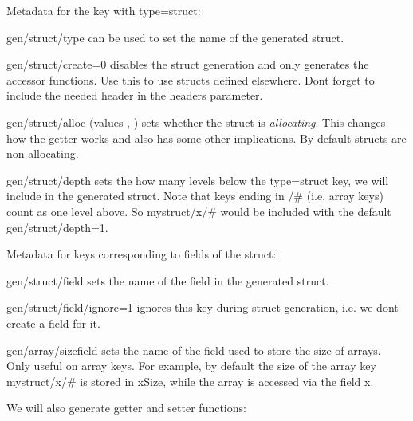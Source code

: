 \begin{DoxyItemize}
\item Metadata for the key with {\ttfamily type=struct}\+:
\begin{DoxyItemize}
\item {\ttfamily gen/struct/type} can be used to set the name of the generated struct.
\item {\ttfamily gen/struct/create=0} disables the struct generation and only generates the accessor functions. Use this to use structs defined elsewhere. Don\textquotesingle{}t forget to include the needed header in the {\ttfamily headers} parameter.
\item {\ttfamily gen/struct/alloc} (values {}, {}) sets whether the struct is {\itshape allocating}. This changes how the getter works and also has some other implications. By default structs are non-\/allocating.
\item {\ttfamily gen/struct/depth} sets the how many levels below the {\ttfamily type=struct} key, we will include in the generated struct. Note that keys ending in {\ttfamily /\#} (i.\+e. array keys) count as one level above. So {\ttfamily mystruct/x/\#} would be included with the default {\ttfamily gen/struct/depth=1}.
\end{DoxyItemize}
\item Metadata for keys corresponding to fields of the struct\+:
\begin{DoxyItemize}
\item {\ttfamily gen/struct/field} sets the name of the field in the generated struct.
\item {\ttfamily gen/struct/field/ignore=1} ignores this key during struct generation, i.\+e. we don\textquotesingle{}t create a field for it.
\item {\ttfamily gen/array/sizefield} sets the name of the field used to store the size of arrays. Only useful on array keys. For example, by default the size of the array key {\ttfamily mystruct/x/\#} is stored in {\ttfamily x\+Size}, while the array is accessed via the field {\ttfamily x}.
\end{DoxyItemize}
\end{DoxyItemize}

We will also generate getter and setter functions\+:


\begin{DoxyCode}{0}
\DoxyCodeLine{\textcolor{comment}{// or ELEKTRA\_GET\_OUT\_PTR\_SIGNATURE (ElektraStructMystruct, StructMystruct);}}
\DoxyCodeLine{\textcolor{comment}{// or ELEKTRA\_GET\_OUT\_PTR\_ARRAY\_ELEMENT\_SIGNATURE (ElektraStructMystruct, StructMystruct);}}
\DoxyCodeLine{}
\end{DoxyCode}


